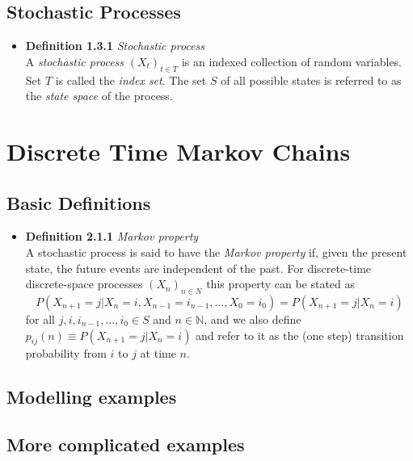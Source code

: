 \documentclass[11pt,a4paper]{article}
\begin{document}
\subsection{Stochastic Processes}
\begin{itemize}
	\item \textbf{Definition 1.3.1} \emph{Stochastic process} \\
		A \emph{stochastic process} $(X_t)_{t \in T}$ is an indexed collection of random variables.
		Set $T$ is called the \emph{index set}.
		The set $S$ of all possible states is referred to as the \emph{state space} of the process.
\end{itemize}

\section{Discrete Time Markov Chains}
\subsection{Basic Definitions}
\begin{itemize}
	\item \textbf{Definition 2.1.1} \emph{Markov property}\\
		A stochastic process is said to have the \emph{Markov property} if, given the present state, the future events are independent of the past.
		For discrete-time discrete-space processes $(X_n)_{n \in N}$ this property can be stated as
		$$P(X_{n+1} = j | X_n = i, X_{n-1} = i_{n-1}, \ldots, X_0 = i_0) = P(X_{n+1} = j | X_n = i)$$
		for all $j, i, i_{n-1}, \ldots, i_0 \in S$ and $n \in \mathbb{N}$,
		and we also define
		$p_{ij}(n) \equiv P(X_{n+1} = j | X_n = i)$
		and refer to it as the (one step) transition probability from $i$ to $j$ at time $n$.
\end{itemize}

\subsection{Modelling examples}
\subsection{More complicated examples }
\end{document}
